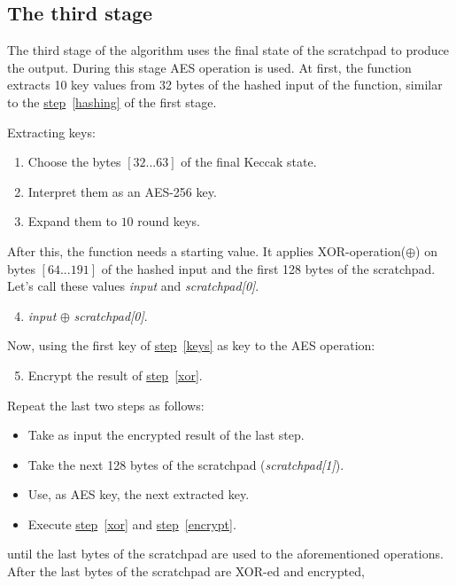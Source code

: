 \subsection{The third stage}
The third stage of the algorithm uses the final state of the scratchpad to produce the output. During this stage AES operation is used. At first, the function extracts 10 key values from 32 bytes of the hashed input of the function, similar to the \hyperref[hashing]{step}~\ref{hashing} of the first stage.

\noindent Extracting keys:
\begin{enumerate}
  \item Choose the bytes $[32...63]$ of the final Keccak state.
  \item Interpret them as an AES-256 key.
  \item \label{keys} Expand them to $10$ round keys.
\end{enumerate}
After this, the function needs a starting value. It applies XOR-operation($\oplus$) on bytes $[64...191]$ of the hashed input and the first 128 bytes of the scratchpad. Let's call these values \emph{input} and \emph{scratchpad[0]}.

\begin{enumerate}
  \setcounter{enumi}{3}
  \item \label{xor} \emph{input} $\oplus$ \emph{scratchpad[0]}.
\end{enumerate}
Now, using the first key of \hyperref[keys]{step}~\ref{keys} as key to the AES operation:

\begin{enumerate}
  \setcounter{enumi}{4}
  \item \label{encrypt} Encrypt the result of \hyperref[xor]{step}~\ref{xor}.
\end{enumerate}
Repeat the last two steps as follows:

\begin{itemize}
  \item Take as input the encrypted result of the last step.
  \item Take the next 128 bytes of the scratchpad (\emph{scratchpad[1]}).
  \item Use, as AES key, the next extracted key.
  \item Execute \hyperref[xor]{step}~\ref{xor} and \hyperref[encrypt]{step}~\ref{encrypt}.
\end{itemize}
until the last bytes of the scratchpad are used to the aforementioned operations. After the last bytes of the scratchpad are XOR-ed and encrypted,

